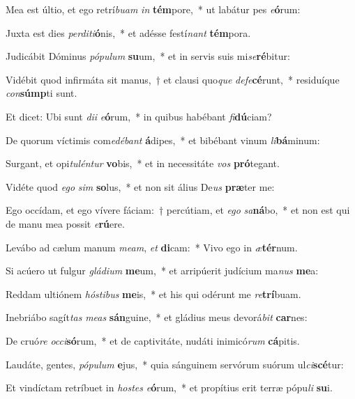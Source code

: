 \item Mea est últio, et ego retrí\textit{bu}\textit{am} \textit{in} \textbf{tém}pore,~* ut labátur pes \textit{e}\textbf{ó}rum:
\item Juxta est dies \textit{per}\textit{di}\textit{ti}\textbf{ó}nis,~* et adésse festí\textit{nant} \textbf{tém}pora.
\item Judicábit Dóminus \textit{pó}\textit{pu}\textit{lum} \textbf{su}um,~* et in servis suis mi\textit{se}\textbf{ré}bitur:
\item Vidébit quod infirmáta sit manus,~† et clausi quo\textit{que} \textit{de}\textit{fe}\textbf{cé}runt,~* residuíque \textit{con}\textbf{súmp}ti sunt.
\item Et dicet: Ubi sunt \textit{di}\textit{i} \textit{e}\textbf{ó}rum,~* in quibus habébant \textit{fi}\textbf{dú}ciam?
\item De quorum víctimis com\textit{e}\textit{dé}\textit{bant} \textbf{á}dipes,~* et bibébant vinum \textit{li}\textbf{bá}minum:
\item Surgant, et opi\textit{tu}\textit{lén}\textit{tur} \textbf{vo}bis,~* et in necessitáte \textit{vos} \textbf{pró}tegant.
\item Vidéte quod \textit{e}\textit{go} \textit{sim} \textbf{so}lus,~* et non sit álius De\textit{us} \textbf{præ}ter me:
\item Ego occídam, et ego vívere fáciam:~† percútiam, et \textit{e}\textit{go} \textit{sa}\textbf{ná}bo,~* et non est qui de manu mea possit \textit{e}\textbf{rú}ere.
\item Levábo ad cælum manum \textit{me}\textit{am}, \textit{et} \textbf{di}cam:~* Vivo ego in \textit{æ}\textbf{tér}num.
\item Si acúero ut fulgur \textit{glá}\textit{di}\textit{um} \textbf{me}um,~* et arripúerit judícium ma\textit{nus} \textbf{me}a:
\item Reddam ultiónem \textit{hós}\textit{ti}\textit{bus} \textbf{me}is,~* et his qui odérunt me \textit{re}\textbf{trí}buam.
\item Inebriábo sagít\textit{tas} \textit{me}\textit{as} \textbf{sán}guine,~* et gládius meus devorá\textit{bit} \textbf{car}nes:
\item De cruó\textit{re} \textit{oc}\textit{ci}\textbf{só}rum,~* et de captivitáte, nudáti inimicó\textit{rum} \textbf{cá}pitis.
\item Laudáte, gentes, \textit{pó}\textit{pu}\textit{lum} \textbf{e}jus,~* quia sánguinem servórum suórum ul\textit{ci}\textbf{scé}tur:
\item Et vindíctam retríbuet in \textit{hos}\textit{tes} \textit{e}\textbf{ó}rum,~* et propítius erit terræ pópu\textit{li} \textbf{su}i.
